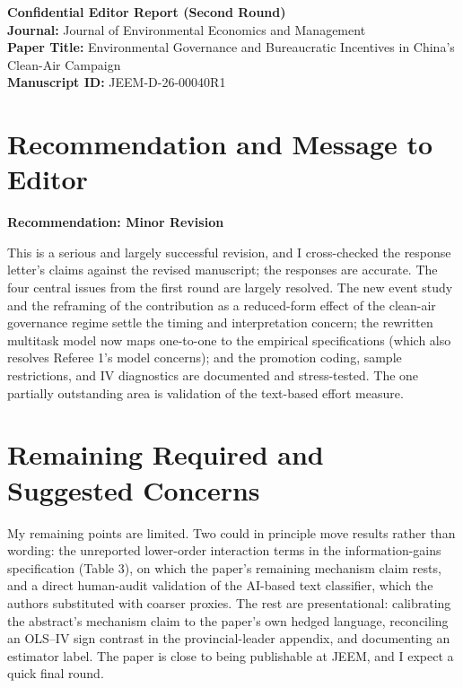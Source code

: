 \documentclass[12pt]{article}
\begin{document}
\begin{center}
    \Large \textbf{Confidential Editor Report (Second Round)}\\[1ex]
    \large \textbf{Journal:} Journal of Environmental Economics and Management\\
    \large \textbf{Paper Title:} Environmental Governance and Bureaucratic Incentives in China's Clean-Air Campaign\\
    \large \textbf{Manuscript ID:} JEEM-D-26-00040R1
\end{center}

\section{Recommendation and Message to Editor}

\textbf{Recommendation: Minor Revision}

This is a serious and largely successful revision, and I cross-checked the response letter's claims against the revised manuscript; the responses are accurate. The four central issues from the first round are largely resolved. The new event study and the reframing of the contribution as a reduced-form effect of the clean-air governance regime settle the timing and interpretation concern; the rewritten multitask model now maps one-to-one to the empirical specifications (which also resolves Referee 1's model concerns); and the promotion coding, sample restrictions, and IV diagnostics are documented and stress-tested. The one partially outstanding area is validation of the text-based effort measure.

\section{Remaining Required and Suggested Concerns}

My remaining points are limited. Two could in principle move results rather than wording: the unreported lower-order interaction terms in the information-gains specification (Table 3), on which the paper's remaining mechanism claim rests, and a direct human-audit validation of the AI-based text classifier, which the authors substituted with coarser proxies. The rest are presentational: calibrating the abstract's mechanism claim to the paper's own hedged language, reconciling an OLS--IV sign contrast in the provincial-leader appendix, and documenting an estimator label. The paper is close to being publishable at JEEM, and I expect a quick final round.
\end{document}
